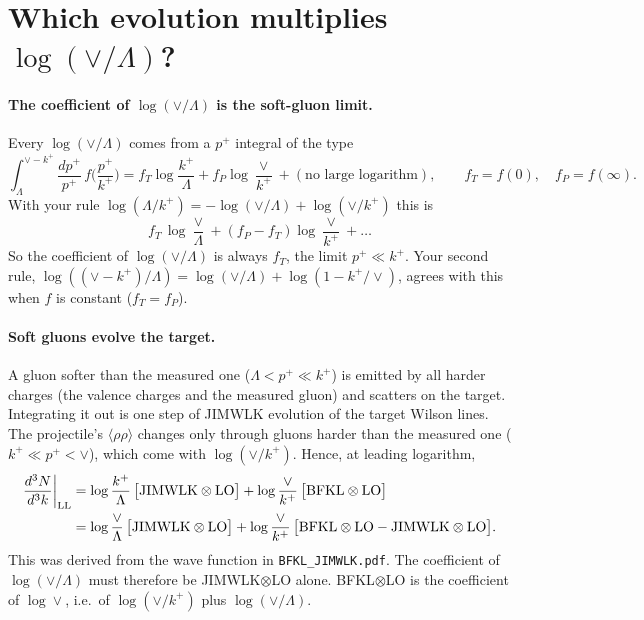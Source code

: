 \documentclass[10pt]{article}
\numberwithin{equation}{section}
\begin{document}
\section{Which evolution multiplies \texorpdfstring{$\log(\vee/\Lambda)$}{log(vee/Lambda)}?}\label{sec:which}
\paragraph{The coefficient of $\log(\vee/\Lambda)$ is the soft-gluon limit.} Every $\log(\vee/\Lambda)$ comes from a $p^+$ integral of the type
\begin{equation}
\int_\Lambda^{\vee-k^+}\frac{dp^+}{p^+}\,f\Big(\frac{p^+}{k^+}\Big)=f_T\log\frac{k^+}{\Lambda}+f_P\log\frac{\vee}{k^+}+(\text{no large logarithm}),\qquad f_T=f(0),\quad f_P=f(\infty).
\end{equation}
With your rule $\log(\Lambda/k^+)=-\log(\vee/\Lambda)+\log(\vee/k^+)$ this is
\begin{equation}
f_T\,\log\frac{\vee}{\Lambda}+(f_P-f_T)\log\frac{\vee}{k^+}+\dots
\end{equation}
So the coefficient of $\log(\vee/\Lambda)$ is always $f_T$, the limit $p^+\ll k^+$. Your second rule, $\log((\vee-k^+)/\Lambda)=\log(\vee/\Lambda)+\log(1-k^+/\vee)$, agrees with this when $f$ is constant ($f_T=f_P$).

\paragraph{Soft gluons evolve the target.} A gluon softer than the measured one ($\Lambda<p^+\ll k^+$) is emitted by all harder charges (the valence charges and the measured gluon) and scatters on the target. Integrating it out is one step of JIMWLK evolution of the target Wilson lines. The projectile's $\langle\rho\rho\rangle$ changes only through gluons harder than the measured one ($k^+\ll p^+<\vee$), which come with $\log(\vee/k^+)$. Hence, at leading logarithm,
\begin{align}
\frac{d^3N}{d^3k}\bigg|_{\rm LL}&=\log\frac{k^+}{\Lambda}\,\big[\text{JIMWLK}\otimes\text{LO}\big]+\log\frac{\vee}{k^+}\,\big[\text{BFKL}\otimes\text{LO}\big]\notag\\
&=\log\frac{\vee}{\Lambda}\,\big[\text{JIMWLK}\otimes\text{LO}\big]+\log\frac{\vee}{k^+}\,\big[\text{BFKL}\otimes\text{LO}-\text{JIMWLK}\otimes\text{LO}\big].
\label{eq:LL}
\end{align}
This was derived from the wave function in \texttt{BFKL\_JIMWLK.pdf}. The coefficient of $\log(\vee/\Lambda)$ must therefore be JIMWLK$\otimes$LO alone. BFKL$\otimes$LO is the coefficient of $\log\vee$, i.e.\ of $\log(\vee/k^+)$ plus $\log(\vee/\Lambda)$.
\end{document}
